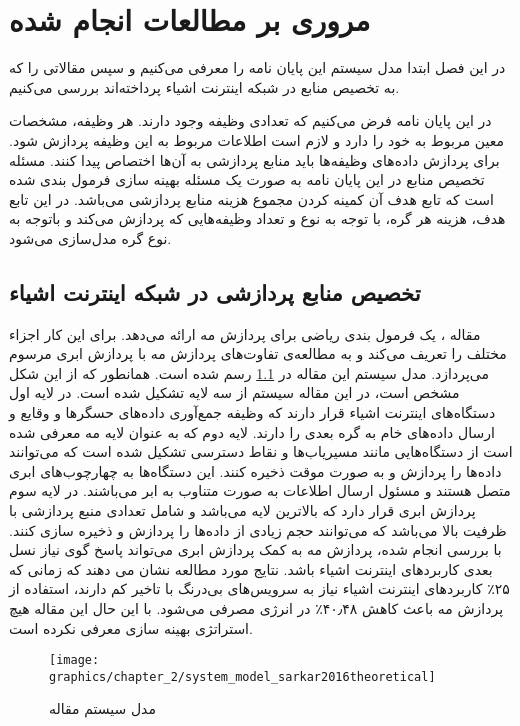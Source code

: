 \chapter{مروری بر مطالعات انجام شده}\label{chap:literature_review}
  \thispagestyle{empty}
  در این فصل ابتدا مدل سیستم این پایان نامه را معرفی می‌کنیم و سپس مقالاتی را که به تخصیص منابع در شبکه اینترنت اشیاء پرداخته‌اند بررسی می‌کنیم.

  در این پایان نامه فرض می‌کنیم که تعدادی وظیفه وجود دارند.
  هر وظیفه، مشخصات معین مربوط به خود را دارد و لازم است اطلاعات مربوط به این وظیفه پردازش شود. 
  برای پردازش داده‌های وظیفه‌ها باید منابع پردازشی به آن‌ها اختصاص پیدا کنند.
  مسئله تخصیص منابع در این پایان نامه به صورت یک مسئله بهینه سازی فرمول بندی شده است که تابع هدف آن کمینه کردن مجموع هزینه منابع پردازشی می‌باشد. 
  در این تابع هدف، هزینه هر گره، با توجه به نوع و تعداد وظیفه‌هایی که پردازش می‌کند و باتوجه به نوع گره مدل‌سازی می‌شود. 

  \section{تخصیص منابع پردازشی در شبکه اینترنت اشیاء}
    مقاله \cite{sarkar2016theoretical}، یک فرمول بندی ریاضی برای پردازش مه ارائه می‌دهد.
    برای این کار اجزاء مختلف را تعریف می‌کند و به مطالعه‌ی تفاوت‌های پردازش مه با پردازش ابری مرسوم می‌پردازد.
    مدل سیستم این مقاله در \cref{fig:chapter_2:system_model_sarkar2016theoretical} رسم شده است.
    همانطور که از این شکل مشخص است، در این مقاله سیستم از سه لایه تشکیل شده است.
    در لایه اول دستگاه‌های اینترنت اشیاء قرار دارند که وظیفه جمع‌آوری داده‌های حسگر‌ها و وقایع و ارسال داده‌های خام به گره بعدی را دارند.
    لایه دوم که به عنوان لایه مه معرفی شده است از دستگاه‌هایی مانند مسیریاب‌ها و نقاط دسترسی تشکیل شده است که می‌توانند داده‌ها را پردازش و به صورت موقت ذخیره کنند.
    این دستگاه‌ها به چهارچوب‌های ابری متصل هستند و مسئول ارسال اطلاعات به صورت متناوب به ابر می‌باشند.
    در لایه سوم پردازش ابری قرار دارد که بالاترین لایه می‌باشد و شامل تعدادی منبع پردازشی با ظرفیت بالا می‌باشد که می‌توانند حجم زیادی از داده‌‌ها را پردازش و ذخیره سازی کنند.
    با بررسی انجام شده، پردازش مه به کمک پردازش ابری می‌تواند پاسخ گوی نیاز نسل بعدی کاربرد‌های اینترنت اشیاء باشد.
    نتایج مورد مطالعه نشان می دهند که زمانی که ۲۵٪ کاربرد‌های اینترنت اشیاء نیاز به سرویس‌های بی‌درنگ با تاخیر کم دارند، استفاده از پردازش مه باعث کاهش ۴۰٫۴۸٪ در انرژی مصرفی می‌شود.
    با این حال این مقاله هیچ استراتژی بهینه سازی معرفی نکرده است.

    \begin{figure}[h]
      \centerline{\texttt{[image: graphics/chapter\_2/system\_model\_sarkar2016theoretical]}}
      \caption{مدل سیستم مقاله \cite{sarkar2016theoretical}}
      \label{fig:chapter_2:system_model_sarkar2016theoretical}
    \end{figure}

